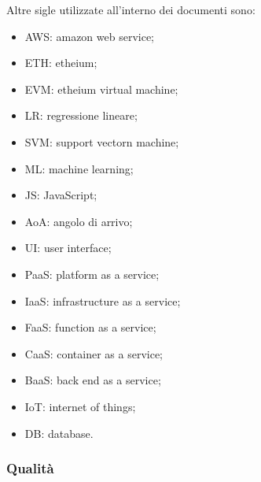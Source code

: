 				Altre sigle utilizzate all'interno dei documenti sono:
				\begin{itemize}
					\item AWS: amazon web service;
					\item ETH: etheium;
					\item EVM: etheium virtual machine;
					\item LR: regressione lineare;
					\item SVM: support vectorn machine;
					\item ML: machine learning;
					\item JS: JavaScript;
					\item AoA: angolo di arrivo;
					\item UI: user interface;
					\item PaaS: platform as a service;
					\item IaaS: infrastructure as a service;
					\item FaaS: function as a service;
					\item CaaS: container as a service;
					\item BaaS: back end as a service;
					\item IoT: internet of things;
					\item DB: database.
				\end{itemize}
		\subsubsection{Qualità}
